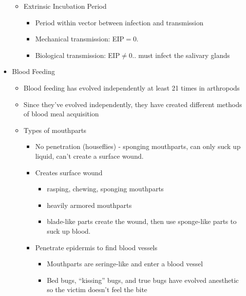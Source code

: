 \documentclass{article}
\begin{document}
\begin{itemize}
\begin{itemize}
\begin{itemize}
                    \end{itemize}
                    \item Extrinsic Incubation Period
                    \begin{itemize}
                        \item Period within vector between infection and transmission
                        \item Mechanical transmission: EIP$=0$.
                        \item Biological transmission: EIP$\neq0$.. must infect the salivary glands
                    \end{itemize}
                \end{itemize}
                \item Blood Feeding
                \begin{itemize}
                    \item Blood feeding has evolved independently at least 21 times in arthropods
                    \item Since they've evolved independently, they have created different methods of blood meal acquisition
                    \item Types of mouthparts
                    \begin{itemize}
                        \item No penetration (houseflies) - sponging mouthparts, can only suck up liquid, can't create a surface wound.
                        \item Creates surface wound
                        \begin{itemize}
                            \item rasping, chewing, sponging mouthparts
                            \item heavily armored mouthparts
                            \item blade-like parts create the wound, then use sponge-like parts to suck up blood.
                        \end{itemize}
                        \item Penetrate epidermis to find blood vessels
                        \begin{itemize}
                            \item Mouthparts are seringe-like and enter a blood vessel
                            \item Bed bugs, ``kissing'' bugs, and true bugs have evolved anesthetic so the victim doesn't feel the bite
                        \end{itemize}
                    \end{itemize}
                \end{itemize}
            \end{itemize}
\end{document}
